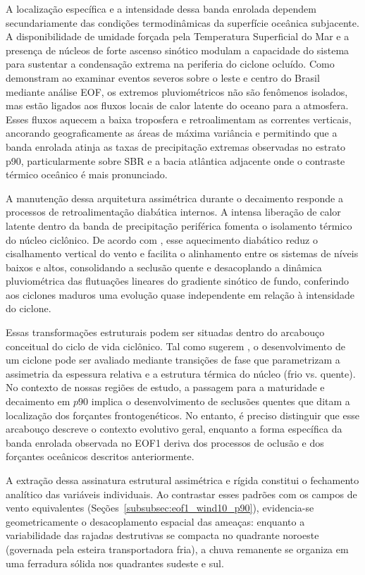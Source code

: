 A localização específica e a intensidade dessa banda enrolada dependem secundariamente das condições termodinâmicas da superfície oceânica subjacente.
A disponibilidade de umidade forçada pela Temperatura Superficial do Mar e a presença de núcleos de forte ascenso sinótico modulam a capacidade do sistema para sustentar a condensação extrema na periferia do ciclone ocluído.
Como demonstram \citet{laureanti2024relation} ao examinar eventos severos sobre o leste e centro do Brasil mediante análise EOF, os extremos pluviométricos não são fenômenos isolados, mas estão ligados aos fluxos locais de calor latente do oceano para a atmosfera.
Esses fluxos aquecem a baixa troposfera e retroalimentam as correntes verticais, ancorando geograficamente as áreas de máxima variância e permitindo que a banda enrolada atinja as taxas de precipitação extremas observadas no estrato p90, particularmente sobre SBR e a bacia atlântica adjacente onde o contraste térmico oceânico é mais pronunciado.

A manutenção dessa arquitetura assimétrica durante o decaimento responde a processos de retroalimentação diabática internos.
A intensa liberação de calor latente dentro da banda de precipitação periférica fomenta o isolamento térmico do núcleo ciclônico.
De acordo com \citet{reboita2022from}, esse aquecimento diabático reduz o cisalhamento vertical do vento e facilita o alinhamento entre os sistemas de níveis baixos e altos, consolidando a seclusão quente e desacoplando a dinâmica pluviométrica das flutuações lineares do gradiente sinótico de fundo, conferindo aos ciclones maduros uma evolução quase independente em relação à intensidade do ciclone.

Essas transformações estruturais podem ser situadas dentro do arcabouço conceitual do ciclo de vida ciclônico.
Tal como sugerem \citet{hart2003cyclone}, o desenvolvimento de um ciclone pode ser avaliado mediante transições de fase que parametrizam a assimetria da espessura relativa e a estrutura térmica do núcleo (frio vs. quente).
No contexto de nossas regiões de estudo, a passagem para a maturidade e decaimento em $p90$ implica o desenvolvimento de seclusões quentes que ditam a localização dos forçantes frontogenéticos.
No entanto, é preciso distinguir que esse arcabouço descreve o contexto evolutivo geral, enquanto a forma específica da banda enrolada observada no EOF1 deriva dos processos de oclusão e dos forçantes oceânicos descritos anteriormente.

A extração dessa assinatura estrutural assimétrica e rígida constitui o fechamento analítico das variáveis individuais.
Ao contrastar esses padrões com os campos de vento equivalentes (Seções~\ref{subsubsec:eof1_wind10_p90}), evidencia-se geometricamente o desacoplamento espacial das ameaças: enquanto a variabilidade das rajadas destrutivas se compacta no quadrante noroeste (governada pela esteira transportadora fria), a chuva remanente se organiza em uma ferradura sólida nos quadrantes sudeste e sul.

